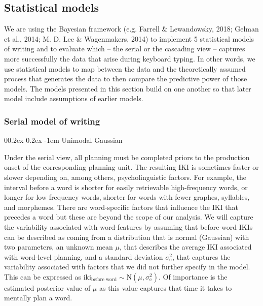 \documentclass[
  english,
  man,floatsintext]{apa7}
\makeatletter
\let\oldparagraph\paragraph
\renewcommand{\paragraph}[1]{\oldparagraph{#1}\mbox{}}
\renewcommand{\paragraph}{\@startsection{paragraph}{4}{\parindent}%
  {0\baselineskip \@plus 0.2ex \@minus 0.2ex}%
  {-1em}%
  {\normalfont\normalsize\bfseries\itshape\typesectitle}}
\makeatother
\begin{document}
\hypertarget{statistical-models}{%
\subsection{Statistical models}\label{statistical-models}}

We are using the Bayesian framework (e.g. Farrell \& Lewandowsky, 2018; Gelman et al., 2014; M. D. Lee \& Wagenmakers, 2014) to implement 5 statistical models of writing and to evaluate which -- the serial or the cascading view -- captures more successfully the data that arise during keyboard typing. In other words, we use statistical models to map between the data and the theoretically assumed process that generates the data to then compare the predictive power of those models. The models presented in this section build on one another so that later model include assumptions of earlier models.

\hypertarget{serial-model-of-writing}{%
\subsubsection{Serial model of writing}\label{serial-model-of-writing}}

\hypertarget{unimodal-gaussian}{%
\paragraph{Unimodal Gaussian}\label{unimodal-gaussian}}

Under the serial view, all planning must be completed priors to the production onset of the corresponding planning unit. The resulting IKI is sometimes faster or slower depending on, among others, psycholinguistic factors. For example, the interval before a word is shorter for easily retrievable high-frequency words, or longer for low frequency words, shorter for words with fewer graphes, syllables, and morphemes. There are word-specific factors that influence the IKI that precedes a word but these are beyond the scope of our analysis. We will capture the variability associated with word-features by assuming that before-word IKIs can be described as coming from a distribution that is normal (Gaussian) with two parameters, an unknown mean \(\mu\), that describes the average IKI associated with word-level planning, and a standard deviation \(\sigma_\text{e}^2\), that captures the variability associated with factors that we did not further specify in the model. This can be expressed as \(\text{iki}_\text{before word} \sim \text{N}(\mu, \sigma_\text{e}^2)\). Of importance is the estimated posterior value of \(\mu\) as this value captures that time it takes to mentally plan a word.
\end{document}
